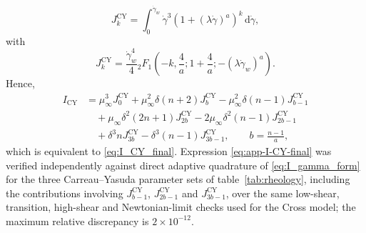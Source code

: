 \documentclass[lineno]{jfm}
\begin{document}
\begin{equation}
J_k^{\mathrm{CY}}
=
\int_0^{\dot{\gamma}_w}
\dot{\gamma}^3
\left(1+(\lambda\dot{\gamma})^a\right)^k
\,\mathrm{d}\dot{\gamma},
\label{eq:app-J-CY-definition}
\end{equation}
with
\begin{equation}
J_k^{\mathrm{CY}}
=
\frac{\dot{\gamma}_w^4}{4}
{}_2F_1\!\left(
-k,\frac{4}{a};
1+\frac{4}{a};
-(\lambda\dot{\gamma}_w)^a
\right).
\label{eq:app-J-CY}
\end{equation}
Hence,
\begin{align}
I_{\mathrm{CY}}
&=
\mu_\infty^3J_0^{\mathrm{CY}}
+\mu_\infty^2\delta(n+2)J_b^{\mathrm{CY}}
-\mu_\infty^2\delta(n-1)J_{b-1}^{\mathrm{CY}}
\nonumber\\
&\quad
+\mu_\infty\delta^2(2n+1)J_{2b}^{\mathrm{CY}}
-2\mu_\infty\delta^2(n-1)J_{2b-1}^{\mathrm{CY}}
\nonumber\\
&\quad
+\delta^3nJ_{3b}^{\mathrm{CY}}
-\delta^3(n-1)J_{3b-1}^{\mathrm{CY}},
\qquad
b=\frac{n-1}{a},
\label{eq:app-I-CY-final}
\end{align}
which is equivalent to \eqref{eq:I_CY_final}.
Expression \eqref{eq:app-I-CY-final} was verified independently against
direct adaptive quadrature of \eqref{eq:I_gamma_form} for the three
Carreau--Yasuda parameter sets of table~\ref{tab:rheology}, including the
contributions involving $J_{b-1}^{\mathrm{CY}}$, $J_{2b-1}^{\mathrm{CY}}$
and $J_{3b-1}^{\mathrm{CY}}$, over the same low-shear, transition,
high-shear and Newtonian-limit checks used for the Cross model; the maximum
relative discrepancy is $2\times10^{-12}$.
\end{document}
